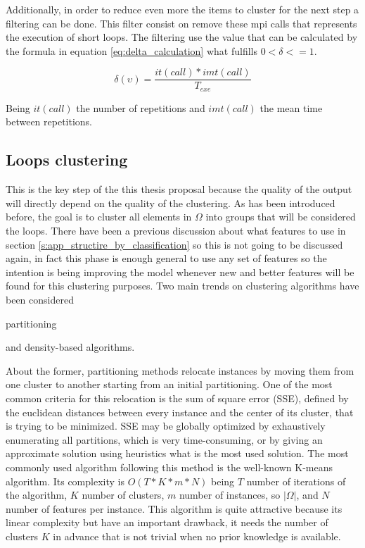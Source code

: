 Additionally, in order to reduce even more the items to cluster for the next
step a filtering can be done. This filter consist on remove these mpi calls that
represents the execution of short loops. The filtering use the value that can be
calculated by the formula in equation \ref{eq:delta_calculation} what 
fulfills $0 < \delta <= 1$.

\begin{equation}
  \delta(\upsilon)=\frac{it(call)*imt(call)}{T_{exe}}
  \label{eq:delta_calculation}
\end{equation}

Being $it(call)$ the number of repetitions and $imt(call)$ the mean time between
repetitions.

\subsection{Loops clustering}\label{ss:loops_clustering}

This is the key step of the this thesis proposal because the quality of the
output will directly depend on the quality of the clustering. As has been introduced
before, the goal is to cluster all elements in $\Omega$ into groups that will be
considered the loops. There have been a previous discussion about what features
to use in section \ref{s:app_structire_by_classification} so this is not going to be
discussed again, in fact this phase is enough general to use any set of
features so the intention is being improving the model whenever new and better
features will be found for this clustering purposes. Two main trends on 
clustering algorithms have been considered \cite{rokach2005clustering}
\begin{enumerate*}[label=\roman*)]
  \item partitioning
  \item and density-based algorithms.
\end{enumerate*} 

About the former, partitioning methods relocate instances by moving them from
one cluster to another starting from an initial partitioning.
One of the most common criteria for this relocation is the sum of square error
(SSE), defined by the euclidean distances between every instance and the center
of its cluster, that is trying to be minimized. SSE may be globally optimized by 
exhaustively enumerating all partitions, which is very time-consuming, 
or by giving an approximate solution using heuristics what is the most used
solution. The most commonly used algorithm following this method is the 
well-known K-means algorithm. Its complexity is $O(T*K*m*N)$ being $T$ number of
iterations of the algorithm, $K$ number of clusters, $m$ number of instances, so
$|\Omega|$, and $N$ number of features per instance. This algorithm is quite attractive because
its linear complexity but have an important drawback, it needs the number of
clusters $K$ in advance that is not trivial when no prior knowledge is
available.

